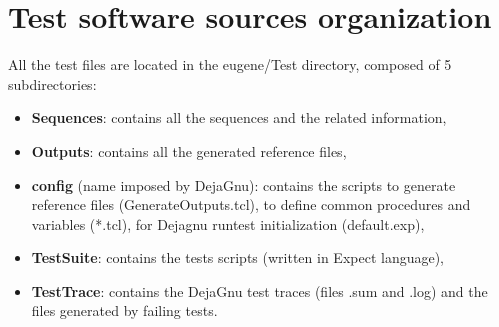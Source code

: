 \documentclass[a4paper,11pt]{article}
\begin{document}
\section{Test software sources organization}
All the test files are located in the eugene/Test directory, composed of 5 subdirectories:
\begin{itemize}
\item {\bf Sequences}: contains all the sequences and the related information,
\item {\bf Outputs}: contains all the generated reference files,
\item {\bf config} (name imposed by DejaGnu): contains the scripts to generate reference files (GenerateOutputs.tcl), to define common procedures and variables (*.tcl), for Dejagnu runtest initialization (default.exp),
\item {\bf TestSuite}: contains the tests scripts (written in Expect language),
\item {\bf TestTrace}: contains the DejaGnu test traces (files .sum and .log) and the files generated by failing tests.
\end{itemize}
\end{document}
